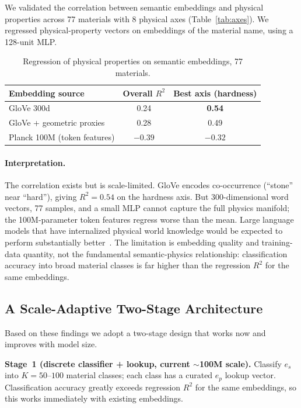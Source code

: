 \documentclass[twoside,11pt]{article}
\begin{document}
We validated the correlation between semantic embeddings and physical properties across 77 materials with 8 physical axes (Table~\ref{tab:axes}). We regressed physical-property vectors on embeddings of the material name, using a 128-unit MLP.

\begin{table}[t]
\centering
\caption{Regression of physical properties on semantic embeddings, 77 materials.}
\label{tab:r2}
\begin{tabular}{lcc}
\toprule
Embedding source & Overall $R^2$ & Best axis (hardness) \\
\midrule
GloVe 300d & 0.24 & \textbf{0.54} \\
GloVe + geometric proxies & 0.28 & 0.49 \\
Planck 100M (token features) & $-0.39$ & $-0.32$ \\
\bottomrule
\end{tabular}
\end{table}

\paragraph{Interpretation.}
The correlation exists but is scale-limited. GloVe encodes co-occurrence (``stone'' near ``hard''), giving $R^2 = 0.54$ on the hardness axis. But 300-dimensional word vectors, 77 samples, and a small MLP cannot capture the full physics manifold; the 100M-parameter token features regress worse than the mean. Large language models that have internalized physical world knowledge would be expected to perform substantially better~\citep{xu2025gaussianproperty,zhao2025physsplat}. The limitation is embedding quality and training-data quantity, not the fundamental semantic-physics relationship: classification accuracy into broad material classes is far higher than the regression $R^2$ for the same embeddings.

\subsection{A Scale-Adaptive Two-Stage Architecture}

Based on these findings we adopt a two-stage design that works now and improves with model size.

\textbf{Stage~1 (discrete classifier + lookup, current $\sim$100M scale).}
Classify $e_s$ into $K = 50\text{--}100$ material classes; each class has a curated $e_p$ lookup vector. Classification accuracy greatly exceeds regression $R^2$ for the same embeddings, so this works immediately with existing embeddings.
\end{document}
